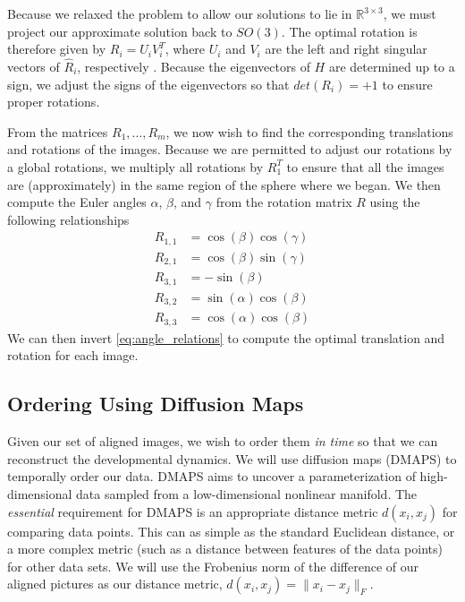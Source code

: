 \documentclass[12pt]{article}
\begin{document}
Because we relaxed the problem to allow our solutions to lie in $\mathbb{R}^{3 \times 3}$, we must project our approximate solution back to $SO(3)$.
%
The optimal rotation is therefore given by $R_i = U_i V_i^T$, where $U_i$ and $V_i$ are the left and right singular vectors of $\hat{R}_i$, respectively \cite{...}. 
%
Because the eigenvectors of $H$ are determined up to a sign, we adjust the signs of the eigenvectors so that $det(R_i) = +1$ to ensure proper rotations.
%

From the matrices $R_1, \dots, R_m$, we now wish to find the corresponding translations and rotations of the images.
%
Because we are permitted to adjust our rotations by a global rotations, we multiply all rotations by $R_1^T$ to ensure that all the images are (approximately) in the same region of the sphere where we began.
%
We then compute the Euler angles $\alpha$, $\beta$, and $\gamma$ from the rotation matrix $R$ using the following relationships
\begin{equation}
\begin{aligned}
R_{1,1} & = \cos(\beta)\cos(\gamma) \\
R_{2,1} & = \cos(\beta)\sin(\gamma) \\
R_{3,1} & = -\sin(\beta) \\
R_{3,2} & = \sin(\alpha)\cos(\beta) \\
R_{3,3} & = \cos(\alpha)\cos(\beta) 
\end{aligned}
\end{equation}
%
We can then invert \eqref{eq:angle_relations} to compute the optimal translation and rotation for each image.

\subsection{Ordering Using Diffusion Maps}

Given our set of aligned images, we wish to order them {\em in time} so that we can reconstruct the developmental dynamics.
%
We will use diffusion maps (DMAPS) \cite{coifman2005geometric} to temporally order our data.
%
DMAPS aims to uncover a parameterization of high-dimensional data sampled from a low-dimensional nonlinear manifold.
%
The {\em essential} requirement for DMAPS is an appropriate distance metric $d(x_i, x_j)$ for comparing data points. 
%
This can as simple as the standard Euclidean distance, or a more complex metric (such as a distance between features of the data points) for other data sets.
%
We will use the Frobenius norm of the difference of our aligned pictures as our distance metric, $d(x_i, x_j) = \| x_i - x_j \|_F$.
\end{document}
